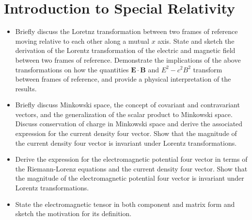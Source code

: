 \section{Introduction to Special Relativity}

\begin{itemize}

    \item Briefly discuss the Loretnz transformation between two frames of reference moving relative to each other along a mutual $ x $ axis. State and sketch the derivation of the Lorentz transformation of the electric and magnetic field between two frames of reference. Demonstrate the implications of the above transformations on how the quantities $ \bm{E} \cdot \bm{B} $ and $ E^{2} - c^{2}B^{2} $ transform between frames of reference, and provide a physical interpretation of the results.

    \item Briefly discuss Minkowski space, the concept of covariant and contravariant vectors, and the generalization of the scalar product to Minkowski space. Discuss conservation of charge in Minkowski space and derive the associated expression for the current density four vector. Show that the magnitude of the current density four vector is invariant under Lorentz transformations.

    \item Derive the expression for the electromagnetic potential four vector in terms of the Riemann-Lorenz equations and the current density four vector. Show that the magnitude of the electromagnetic potential four vector is invariant under Lorentz transformations.

    \item State the electromagnetic tensor in both component and matrix form and sketch the motivation for its definition.

\end{itemize}


